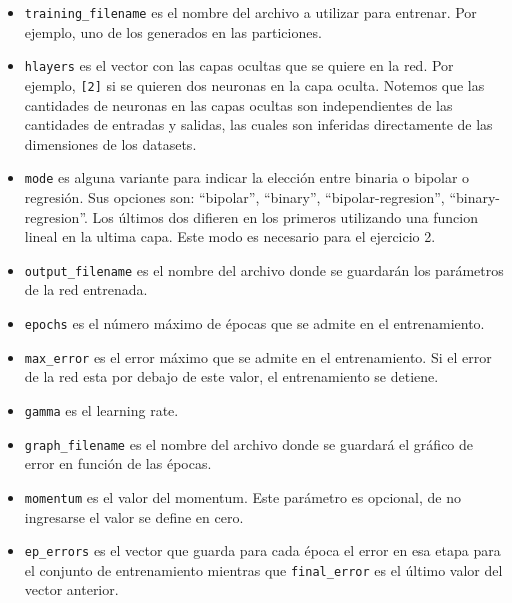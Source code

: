 \documentclass[informe.tex]{subfiles}
\begin{document}
    \begin{itemize}
     \item \verb|training_filename| es el nombre del archivo a utilizar para entrenar. Por ejemplo, uno de los generados en las particiones.
     
     \item \verb|hlayers| es el vector con las capas ocultas que se quiere en la red. Por ejemplo, \verb|[2]| si se quieren dos neuronas en la capa oculta. Notemos que las cantidades de neuronas en las capas ocultas son independientes de las cantidades de entradas y salidas, las cuales son inferidas directamente de las dimensiones de los datasets.
    
     \item \verb|mode| es alguna variante para indicar la elección entre binaria o bipolar o regresión. Sus opciones son: ``bipolar'', ``binary'', ``bipolar-regresion'', ``binary-regresion''. Los \'ultimos dos difieren en los primeros utilizando una funcion lineal en la ultima capa. Este modo es necesario para el ejercicio 2.
    
     \item \verb|output_filename| es el nombre del archivo donde se guardarán los parámetros de la red entrenada.
    
     \item \verb|epochs| es el número máximo de épocas que se admite en el entrenamiento.
    
     \item \verb|max_error| es el error m\'aximo que se admite en el entrenamiento. Si el error de la red esta por debajo de este valor, el entrenamiento se detiene.
    
     \item \verb|gamma| es el learning rate.
    
     \item \verb|graph_filename| es el nombre del archivo donde se guardará el gráfico de error en función de las épocas.
     
     \item \verb|momentum| es el valor del momentum. Este par\'ametro es opcional, de no ingresarse el valor se define en cero.

     \item \verb|ep_errors| es el vector que guarda para cada época el error en esa etapa para el conjunto de entrenamiento mientras que \verb|final_error| es el \'ultimo valor del vector anterior.
    
    \end{itemize}
    
\end{document}
